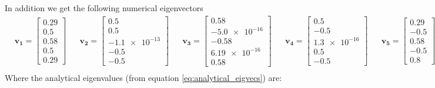 \documentclass[american,a4paper,12pt]{article}
\renewcommand{\vec}[1]{\mathbf{#1}} %
\begin{document}
In addition we get the following numerical eigenvectors
\begin{align*}
    &\vec{v_1} = \begin{bmatrix} 0.29 \\ 0.5 \\ 0.58 \\ 0.5 \\ 0.29                             \end{bmatrix}&
    &\vec{v_2} = \begin{bmatrix} 0.5 \\ 0.5 \\ \num{-1.1e-13} \\ -0.5 \\ -0.5                         \end{bmatrix}&
    &\vec{v_3} = \begin{bmatrix} 0.58 \\ \num{-5.0e-16} \\ -0.58 \\ \num{6.19e-16} \\ 0.58      \end{bmatrix}&
    &\vec{v_4} = \begin{bmatrix} 0.5 \\ -0.5 \\ \num{1.3e-16} \\ 0.5 \\ -0.5                    \end{bmatrix}&
    &\vec{v_5} = \begin{bmatrix} 0.29 \\ -0.5 \\ 0.58 \\ -0.5 \\ 0.8                            \end{bmatrix}& \\
\end{align*} 
Where the analytical eigenvalues (from equation \ref{eq:analytical_eigvecs}) are:
\end{document}
